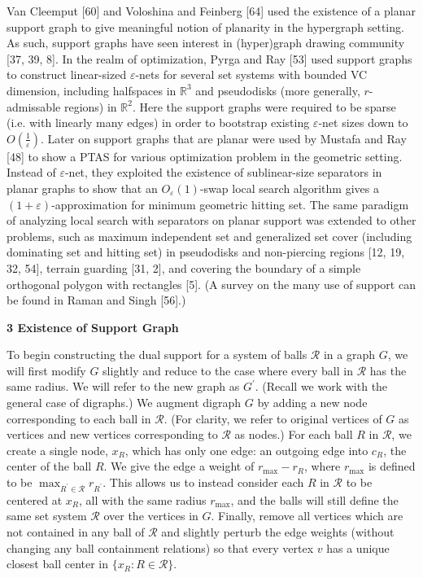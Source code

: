 \documentclass[10pt,a4paper]{article}
\begin{document}
Van Cleemput [60] and Voloshina and Feinberg [64] used the existence of a planar support graph to give meaningful notion of planarity in the hypergraph setting. As such, support graphs have seen interest in (hyper)graph drawing community [37, 39, 8]. In the realm of optimization, Pyrga and Ray [53] used support graphs to construct linear-sized $\varepsilon$-nets for several set systems with bounded VC dimension, including halfspaces in $\mathbb{R}^{3}$ and pseudodisks (more generally, $r$-admissable regions) in $\mathbb{R}^{2}$. Here the support graphs were required to be sparse (i.e. with linearly many edges) in order to bootstrap existing $\varepsilon$-net sizes down to $O(\frac{1}{\varepsilon})$. Later on support graphs that are planar were used by Mustafa and Ray [48] to show a PTAS for various optimization problem in the geometric setting. Instead of $\varepsilon$-net, they exploited the existence of sublinear-size separators in planar graphs to show that an $O_{\varepsilon}(1)$-swap local search algorithm gives a $(1+\varepsilon)$-approximation for minimum geometric hitting set. The same paradigm of analyzing local search with separators on planar support was extended to other problems, such as maximum independent set and generalized set cover (including dominating set and hitting set) in pseudodisks and non-piercing regions [12, 19, 32, 54], terrain guarding [31, 2], and covering the boundary of a simple orthogonal polygon with rectangles [5]. (A survey on the many use of support can be found in Raman and Singh [56].)
\par
\par
\par\medskip\noindent\textbf{3 Existence of Support Graph}\par
To begin constructing the dual support for a system of balls $\mathcal{R}$ in a graph $G$, we will first modify $G$ slightly and reduce to the case where every ball in $\mathcal{R}$ has the same radius. We will refer to the new graph as $G^{\prime}$. (Recall we work with the general case of digraphs.) We augment digraph $G$ by adding a new node corresponding to each ball in $\mathcal{R}$. (For clarity, we refer to original vertices of $G$ as vertices and new vertices corresponding to $\mathcal{R}$ as nodes.) For each ball $R$ in $\mathcal{R}$, we create a single node, $x_{R}$, which has only one edge: an outgoing edge into $c_{R}$, the center of the ball $R$. We give the edge a weight of $r_{\max}-r_{R}$, where $r_{\max}$ is defined to be $\max_{R^{\prime}\in\mathcal{R}}r_{R^{\prime}}$. This allows us to instead consider each $R$ in $\mathcal{R}$ to be centered at $x_{R}$, all with the same radius $r_{\max}$, and the balls will still define the same set system $\mathcal{R}$ over the vertices in $G$. Finally, remove all vertices which are not contained in any ball of $\mathcal{R}$ and slightly perturb the edge weights (without changing any ball containment relations) so that every vertex $v$ has a unique closest ball center in $\{x_{R}:R\in\mathcal{R}\}$.
\end{document}
